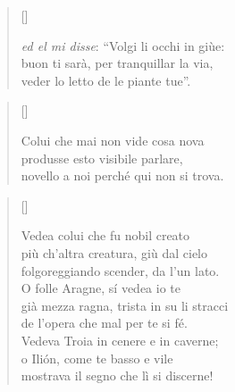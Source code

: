 \documentclass{article}
\begin{document}
\begin{verse}[\versewidth]
  \begin{patverse*}
    \emph{ed el mi disse}: ``Volgi li occhi in giùe:\\
    buon ti sarà, per tranquillar la via,\\
    veder lo letto de le piante tue''.
  \end{patverse*}
\end{verse}

\begin{verse}[\versewidth]
  \begin{patverse*}
    Colui che mai non vide cosa nova\\
    produsse esto visibile parlare,\\
    novello a noi perché qui non si trova.
  \end{patverse*}
\end{verse}

\begin{verse}[\versewidth]
  \begin{patverse*}
    Vedea colui che fu nobil creato\\
    più ch'altra creatura, giù dal cielo\\
    folgoreggiando scender, da l'un lato.\\[10pt]
    O folle Aragne, sí vedea io te\\
    già mezza ragna, trista in su li stracci\\
    de l'opera che mal per te si fé.\\[10pt]
    Vedeva Troia in cenere e in caverne;\\
    o Ilión, come te basso e vile\\
    mostrava il segno che lì si discerne!
  \end{patverse*}
\end{verse}
\end{document}
